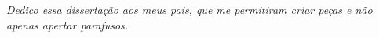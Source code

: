 \begin{dedicatoria}
   \vspace*{\fill}
   \centering
   \noindent
   \textit{Dedico essa dissertação aos meus pais, que me permitiram criar peças e não apenas apertar parafusos.} \vspace*{\fill}
\end{dedicatoria}
